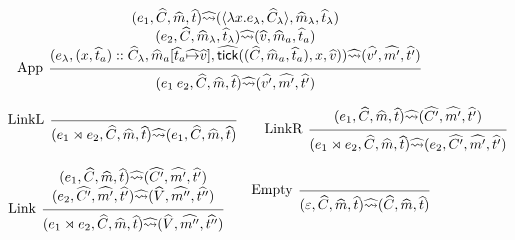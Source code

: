 \documentclass{article}
\theoremstyle{definition}
\newcommand*{\cons}{::}
\newcommand*{\A}[1]{\widehat{#1}}
\newcommand*{\mem}{m}
\newcommand*{\semarrow}{\rightsquigarrow}
\newcommand*{\link}[2]{{#1}\rtimes{#2}}
\newcommand*{\tick}{\mathsf{tick}}
\begin{document}
\begin{figure}[h!]
  \[
    \begin{prooftree}
      \hypo{
        \begin{matrix}
          (e_{1}, \A{C}, \A\mem, \A{t})
          \A\semarrow
          (\langle\lambda x.e_{\lambda}, \A{C}_{\lambda}\rangle, \A\mem_{\lambda}, \A{t}_{\lambda}) \\
          (e_{2}, \A{C}, \A\mem_{\lambda}, \A{t}_{\lambda})
          \A\semarrow
          (\A{v}, \A\mem_{a}, \A{t}_{a})                                                            \\
          (e_{\lambda}, (x, \A{t}_{a})\cons \A{C}_{\lambda}, \A\mem_{a}[\A{t}_{a}\A\mapsto \A{v}], \A\tick((\A{C},\A\mem_{a},\A{t}_{a}),x,\A{v}))
          \A\semarrow
          (\A{v'}, \A{\mem'},\A{t'})
        \end{matrix}
      }
      \infer[left label={App}]1{
      (e_{1}\:e_{2}, \A{C}, \A\mem, \A{t})
      \A\semarrow
      (\A{v'}, \A{\mem'},\A{t'})
      }
    \end{prooftree}
  \]

  \[
    \begin{prooftree}
      \infer[left label=LinkL]0{
      (\link{e_{1}}{e_{2}}, \A{C}, \A\mem, \A{t})
      \A\semarrow
      (e_{1}, \A{C}, \A\mem, \A{t})
      }
    \end{prooftree}\qquad
    \begin{prooftree}
      \hypo{
        \begin{matrix}
          (e_{1}, \A{C}, \A\mem, \A{t})
          \A\semarrow
          (\A{C'}, \A{\mem'}, \A{t'})
        \end{matrix}
      }
      \infer[left label=LinkR]1{
      (\link{e_{1}}{e_{2}}, \A{C}, \A\mem, \A{t})
      \A\semarrow
      (e_{2}, \A{C'}, \A{\mem'}, \A{t'})
      }
    \end{prooftree}
  \]

  \[
    \begin{prooftree}
      \hypo{
        \begin{matrix}
          (e_{1}, \A{C}, \A\mem, \A{t})
          \A\semarrow
          (\A{C'}, \A{\mem'}, \A{t'}) \\
          (e_{2}, \A{C'}, \A{\mem'}, \A{t'})
          \A\semarrow
          (\A{V}, \A{\mem''}, \A{t''})
        \end{matrix}
      }
      \infer[left label=Link]1{
      (\link{e_{1}}{e_{2}}, \A{C}, \A\mem, \A{t})
      \A\semarrow
      (\A{V}, \A{\mem''}, \A{t''})
      }
    \end{prooftree}\qquad
    \begin{prooftree}
      \infer[left label=Empty]0{
      (\varepsilon, \A{C}, \A\mem, \A{t})
      \A\semarrow
      (\A{C}, \A\mem, \A{t})
      }
    \end{prooftree}
  \]


\end{figure}
\end{document}
